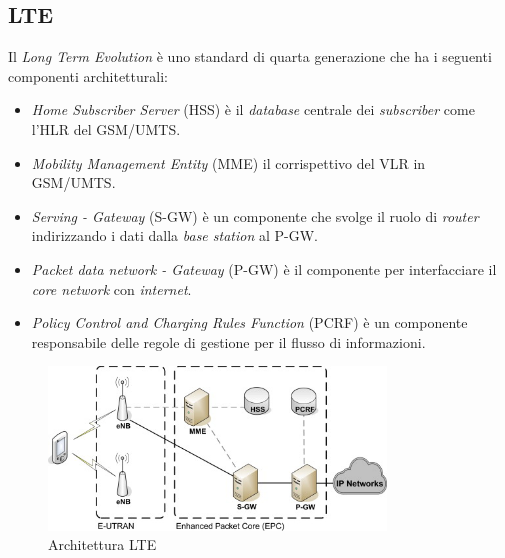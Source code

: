 \subsection{LTE}
Il \textit{Long Term Evolution} è uno standard di quarta generazione che ha i seguenti componenti architetturali\cite{lte}:
\begin{itemize}
    \item \textit{Home Subscriber Server} (HSS) è il \textit{database} centrale dei \textit{subscriber} come l'HLR del GSM/UMTS.
    \item \textit{Mobility Management Entity} (MME) il corrispettivo del VLR in GSM/UMTS.
    \item \textit{Serving - Gateway} (S-GW) è un componente che svolge il ruolo di \textit{router} indirizzando i dati dalla \textit{base station}
    al P-GW.
    \item \textit{Packet data network - Gateway} (P-GW) è il componente per interfacciare il \textit{core network} con \textit{internet}.
    \item \textit{Policy Control and Charging Rules Function} (PCRF) è un componente responsabile delle regole di gestione per il flusso di informazioni.
\end{itemize}
\begin{figure}[ht]
    \centering
    \includegraphics[width=0.8\textwidth]{images/4g-lte.jpg}
    \caption{Architettura LTE}
\end{figure}

\clearpage

